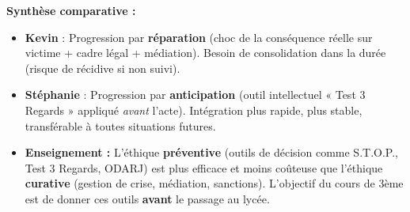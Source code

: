 \documentclass[11pt]{article}
\begin{document}
\begin{exoresolu}
\textbf{Synthèse comparative :}
\begin{itemize}
    \item \textbf{Kevin} : Progression par \textbf{réparation} (choc de la conséquence réelle sur victime + cadre légal + médiation). Besoin de consolidation dans la durée (risque de récidive si non suivi).
    \item \textbf{Stéphanie} : Progression par \textbf{anticipation} (outil intellectuel « Test 3 Regards » appliqué \emph{avant} l'acte). Intégration plus rapide, plus stable, transférable à toutes situations futures.
    \item \textbf{Enseignement :} L'éthique \textbf{préventive} (outils de décision comme S.T.O.P., Test 3 Regards, ODARJ) est plus efficace et moins coûteuse que l'éthique \textbf{curative} (gestion de crise, médiation, sanctions). L'objectif du cours de 3ème est de donner ces outils \textbf{avant} le passage au lycée.
\end{itemize}
\end{exoresolu}
\end{document}
